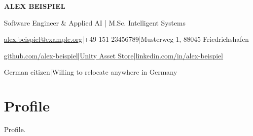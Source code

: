 \documentclass[10pt,a4paper]{article}
\begin{document}
{\fontsize{24}{27}\selectfont\color{navy}\textbf{ALEX BEISPIEL}}\par\vspace{1pt}
{\large Software Engineer \& Applied AI | M.Sc. Intelligent Systems}\par\vspace{3pt}
{\small \href{mailto:alex.beispiel@example.org}{alex.beispiel@example.org}\enspace\textcolor{rule}{|}\enspace +49 151 23456789\enspace\textcolor{rule}{|}\enspace Musterweg 1, 88045 Friedrichshafen\par}
{\small \href{https://github.com/alex-beispiel}{github.com/alex-beispiel}\enspace\textcolor{rule}{|}\enspace \href{https://assetstore.unity.com/publishers/000000}{Unity Asset Store}\enspace\textcolor{rule}{|}\enspace \href{https://www.linkedin.com/in/alex-beispiel/}{linkedin.com/in/alex-beispiel}\par}
{\small German citizen\enspace\textcolor{rule}{|}\enspace Willing to relocate anywhere in Germany\par}
\vspace{3pt}{\color{navy}\rule{\linewidth}{1.2pt}}

\section{Profile}
Profile.\par
\end{document}

